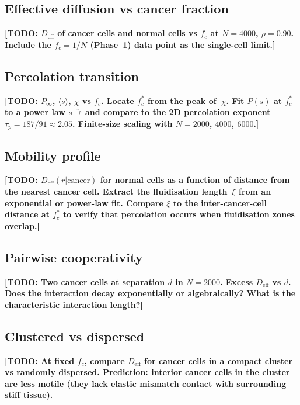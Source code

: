 \documentclass[aps,pre,twocolumn,superscriptaddress,longbibliography,floatfix]{revtex4-2}
\newcommand{\Deff}{D_{\mathrm{eff}}}       %
\newcommand{\fc}{f_c}                      %
\newcommand{\TODO}[1]{{\color{red}\textbf{[TODO: #1]}}}
\begin{document}
\subsection{Effective diffusion vs cancer fraction}
\label{sec:percolation:Deff}

\TODO{$\Deff$ of cancer cells and normal cells vs $\fc$ at
$N = 4000$, $\rho = 0.90$.  Include the $\fc = 1/N$ (Phase~1)
data point as the single-cell limit.}

\subsection{Percolation transition}
\label{sec:percolation:transition}

\TODO{$P_\infty$, $\langle s \rangle$, $\chi$ vs $\fc$.  Locate
$\fc^*$ from the peak of~$\chi$.  Fit $P(s)$ at $\fc^*$ to a
power law $s^{-\tau_p}$ and compare to the 2D percolation exponent
$\tau_p = 187/91 \approx 2.05$.  Finite-size scaling with
$N = 2000$, $4000$, $6000$.}

\subsection{Mobility profile}
\label{sec:percolation:profile}

\TODO{$\Deff(r | \text{cancer})$ for normal cells as a function of
distance from the nearest cancer cell.  Extract the fluidisation
length~$\xi$ from an exponential or power-law fit.  Compare $\xi$
to the inter-cancer-cell distance at $\fc^*$ to verify that
percolation occurs when fluidisation zones overlap.}

\subsection{Pairwise cooperativity}
\label{sec:percolation:pair}

\TODO{Two cancer cells at separation $d$ in $N = 2000$.  Excess
$\Deff$ vs $d$.  Does the interaction decay exponentially or
algebraically?  What is the characteristic interaction length?}

\subsection{Clustered vs dispersed}
\label{sec:percolation:geometry}

\TODO{At fixed $\fc$, compare $\Deff$ for cancer cells in a compact
cluster vs randomly dispersed.  Prediction: interior cancer cells in
the cluster are less motile (they lack elastic mismatch contact with
surrounding stiff tissue).}
\end{document}
